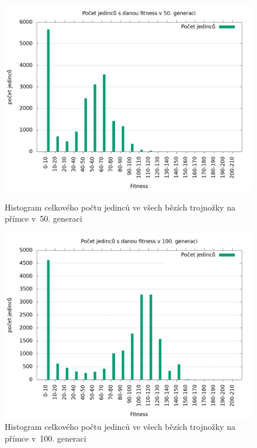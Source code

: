 \begin{figure}[h]
    \begin{minipage}[c]{0.48\linewidth}
        \includegraphics[width=\linewidth]{obrazky/trojnozka_primka_fitnessHistogram50.png}
        \caption{Histogram celkového počtu jedinců ve všech bězích trojnožky na přímce v~50. generaci}
        \label{fig:trojnozka_primka_histogram_50}
    \end{minipage}
    \hfill
    \begin{minipage}[c]{0.48\linewidth}
        \includegraphics[width=\linewidth]{obrazky/trojnozka_primka_fitnessHistogram100.png}
        \caption{Histogram celkového počtu jedinců ve všech bězích trojnožky na přímce v~100. generaci}
        \label{fig:trojnozka_primka_histogram_100}
    \end{minipage}
\end{figure}

